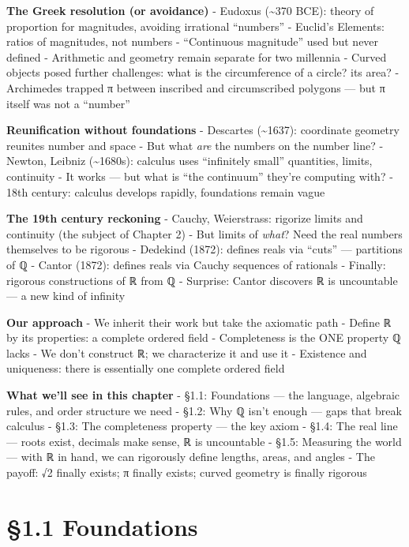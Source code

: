 \documentclass[
  10pt,
  letterpaper,
]{scrbook}
\begin{document}
\textbf{The Greek resolution (or avoidance)} - Eudoxus
(\textasciitilde370 BCE): theory of proportion for magnitudes, avoiding
irrational ``numbers'' - Euclid's Elements: ratios of magnitudes, not
numbers - ``Continuous magnitude'' used but never defined - Arithmetic
and geometry remain separate for two millennia - Curved objects posed
further challenges: what is the circumference of a circle? its area? -
Archimedes trapped π between inscribed and circumscribed polygons ---
but π itself was not a ``number''

\textbf{Reunification without foundations} - Descartes
(\textasciitilde1637): coordinate geometry reunites number and space -
But what \emph{are} the numbers on the number line? - Newton, Leibniz
(\textasciitilde1680s): calculus uses ``infinitely small'' quantities,
limits, continuity - It works --- but what is ``the continuum'' they're
computing with? - 18th century: calculus develops rapidly, foundations
remain vague

\textbf{The 19th century reckoning} - Cauchy, Weierstrass: rigorize
limits and continuity (the subject of Chapter 2) - But limits of
\emph{what}? Need the real numbers themselves to be rigorous - Dedekind
(1872): defines reals via ``cuts'' --- partitions of ℚ - Cantor (1872):
defines reals via Cauchy sequences of rationals - Finally: rigorous
constructions of ℝ from ℚ - Surprise: Cantor discovers ℝ is uncountable
--- a new kind of infinity

\textbf{Our approach} - We inherit their work but take the axiomatic
path - Define ℝ by its properties: a complete ordered field -
Completeness is the ONE property ℚ lacks - We don't construct ℝ; we
characterize it and use it - Existence and uniqueness: there is
essentially one complete ordered field

\textbf{What we'll see in this chapter} - §1.1: Foundations --- the
language, algebraic rules, and order structure we need - §1.2: Why ℚ
isn't enough --- gaps that break calculus - §1.3: The completeness
property --- the key axiom - §1.4: The real line --- roots exist,
decimals make sense, ℝ is uncountable - §1.5: Measuring the world ---
with ℝ in hand, we can rigorously define lengths, areas, and angles -
The payoff: √2 finally exists; π finally exists; curved geometry is
finally rigorous

\section{§1.1 Foundations}\label{foundations}
\end{document}
